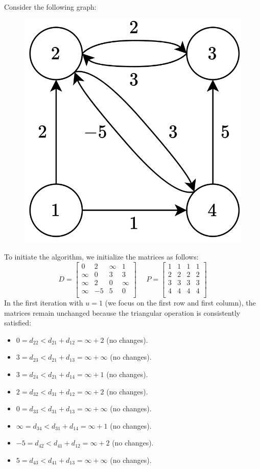 \begin{example}
    Consider the following graph:
    \begin{figure}[H]
        \centering
        \includegraphics[width=0.2\linewidth]{images/floyd.png}
    \end{figure}
    To initiate the algorithm, we initialize the matrices as follows:
    \[D=\begin{bmatrix}
        0 & 2 & \infty & 1 \\
        \infty & 0 & 3 & 3 \\
        \infty & 2 & 0 & \infty \\
        \infty & -5 & 5 & 0 \\
    \end{bmatrix}
    \:\:\:\:\:\:
    P=\begin{bmatrix}
        1 & 1 & 1 & 1 \\
        2 & 2 & 2 & 2 \\
        3 & 3 & 3 & 3 \\
        4 & 4 & 4 & 4 \\
    \end{bmatrix}
    \]
    In the first iteration with $u=1$ (we focus on the first row and first column), the matrices remain unchanged because the triangular operation is consistently satisfied:
    \begin{itemize}
        \item $0=d_{22} < d_{21} + d_{12} = \infty + 2$ (no changes). 
        \item $3=d_{23} < d_{21} + d_{13} = \infty + \infty$ (no changes). 
        \item $3=d_{24} < d_{21} + d_{14} = \infty + 1$ (no changes). 
        \item $2=d_{32} < d_{31} + d_{12} = \infty + 2$ (no changes). 
        \item $0=d_{33} < d_{31} + d_{13} = \infty + \infty$ (no changes). 
        \item $\infty=d_{34} < d_{31} + d_{14} = \infty + 1$ (no changes). 
        \item $-5=d_{42} < d_{41} + d_{12} = \infty + 2$ (no changes). 
        \item $5=d_{43} < d_{41} + d_{13} = \infty + \infty$ (no changes). 

\end{itemize}
\end{example}
